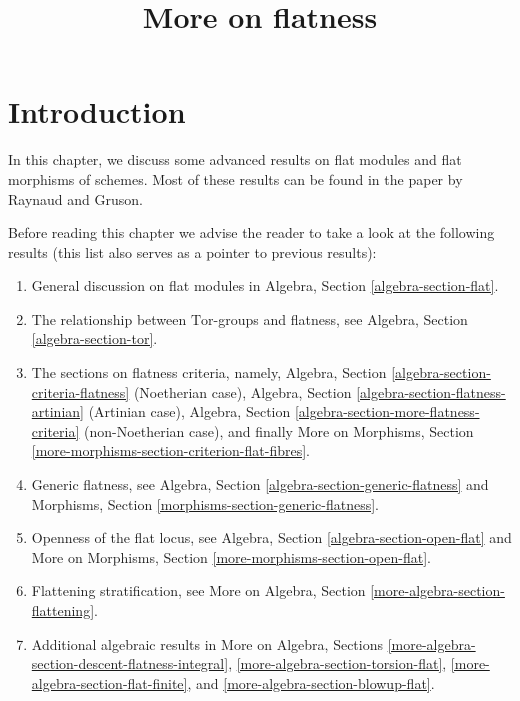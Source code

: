 

%


\title{More on flatness}

\maketitle

\label{section-phantom}

\tableofcontents



\section{Introduction}
\label{section-introduction}

\noindent
In this chapter, we discuss some advanced results on flat modules and
flat morphisms of schemes. Most of these results can be
found in the paper \cite{GruRay} by Raynaud and Gruson.

\medskip\noindent
Before reading this chapter we advise the reader to take a look
at the following results (this list also serves as a pointer to
previous results):
\begin{enumerate}
\item General discussion on flat modules in
Algebra, Section \ref{algebra-section-flat}.
\item The relationship between $\text{Tor}$-groups and flatness, see
Algebra, Section \ref{algebra-section-tor}.
\item The sections on flatness criteria, namely,
Algebra, Section \ref{algebra-section-criteria-flatness}
(Noetherian case),
Algebra, Section \ref{algebra-section-flatness-artinian}
(Artinian case),
Algebra, Section \ref{algebra-section-more-flatness-criteria}
(non-Noetherian case), and finally
More on Morphisms, Section \ref{more-morphisms-section-criterion-flat-fibres}.
\item Generic flatness, see
Algebra, Section \ref{algebra-section-generic-flatness}
and
Morphisms, Section \ref{morphisms-section-generic-flatness}.
\item Openness of the flat locus, see
Algebra, Section \ref{algebra-section-open-flat}
and
More on Morphisms, Section \ref{more-morphisms-section-open-flat}.
\item Flattening stratification, see
More on Algebra, Section \ref{more-algebra-section-flattening}.
\item Additional algebraic results in
More on Algebra, Sections \ref{more-algebra-section-descent-flatness-integral},
\ref{more-algebra-section-torsion-flat},
\ref{more-algebra-section-flat-finite}, and
\ref{more-algebra-section-blowup-flat}.
\end{enumerate}




